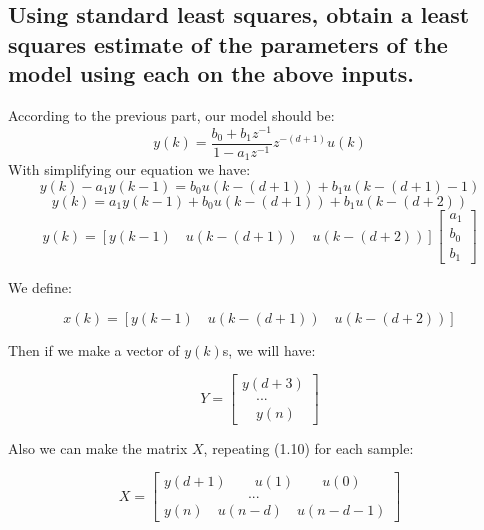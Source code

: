 \documentclass[11pt]{scrartcl} %
\begin{document}
\subsection{Using standard least squares, obtain a least squares estimate of the parameters of the model using
each on the above inputs.}
According to the previous part, our model should be:
\begin{equation}y(k)=\frac{b_{0}+b_{1} z^{-1}}{1-a_{1} z^{-1}} z^{-(d+1)} u(k)\end{equation}
With simplifying our equation we have:
\begin{equation}y(k)-a_{1} y(k-1)=b_{0} u(k-(d+1))+b_{1} u(k-(d+1)-1)\end{equation}
\begin{equation}y(k)=a_{1} y(k-1)+b_{0} u(k-(d+1))+b_{1} u(k-(d+2))\end{equation}
\begin{equation}y(k)=[y(k-1) \quad u(k-(d+1)) \quad u(k-(d+2))] \left[\begin{array}{l}
a_{1} \\
b_{0} \\
b_{1}
\end{array}\right]\end{equation}

We define:

\begin{equation}x(k)=[y(k-1) \quad u(k-(d+1)) \quad u(k-(d+2))] \end{equation}

Then if we make a vector of $y(k)$s, we will have:

\begin{equation}Y=\left[\begin{array}{l}
y(d+3) \\
\quad ... \\
\quad y(n)
\end{array}\right]\end{equation}

Also we can make the matrix $X$, repeating (1.10) for each sample:

\begin{equation}X=\left[\begin{array}{l}
y(d+1) \quad \quad u(1) \quad \quad u(0) \\
\quad \quad \quad \quad \quad \quad ... \\
y(n) \quad u(n-d) \quad u(n-d-1)
\end{array}\right]\end{equation}
\end{document}
